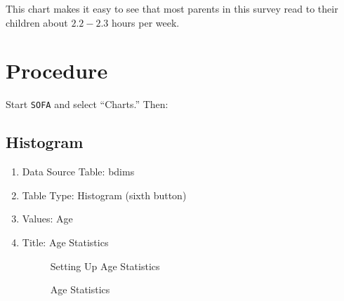 This chart makes it easy to see that most parents in this survey read to their children about $ 2.2-2.3 $ hours per week. 

\section{Procedure}

Start \texttt{SOFA} and select ``Charts.'' Then:

\subsection{Histogram}

\begin{enumerate}
  \item Data Source Table: bdims
  \item Table Type: Histogram (sixth button)
  \item Values: Age 
  \item Title: Age Statistics
  
  \begin{figure}[H]
    \begin{center}
      \caption{Setting Up Age Statistics}
    \end{center}
  \end{figure}
  
  \begin{figure}[H]
    \begin{center}
      \caption{Age Statistics}
    \end{center}
  \end{figure}
  
\end{enumerate}

